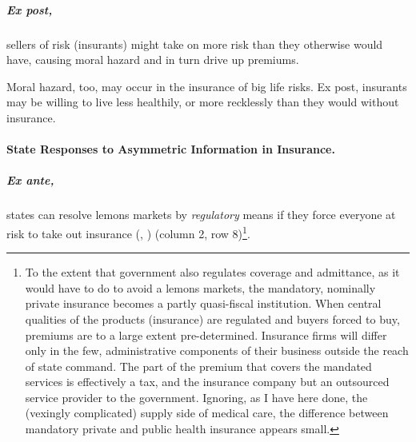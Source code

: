 \subparagraph[Moral Hazard]{Ex post,}  \label{sec:moral_hazard} sellers of risk (insurants) might take on more risk than they otherwise would have, causing moral hazard and in turn drive up premiums. 

Moral hazard, too, may occur in the insurance of big life risks. Ex post, insurants may be willing to live less healthily, or more recklessly than they would without insurance.

\paragraph{State Responses to Asymmetric Information in Insurance.}  \label{sec:state_insurance}

\subparagraph{Ex ante,} states can resolve lemons markets by \emph{regulatory} means if they force everyone at risk to take out insurance (\citealt{Akerlof-1970-aa}, \citealt{Barr})
(column 2, row 8)\footnote{
	To the extent that government also regulates coverage and admittance, as it would have to do to avoid a lemons markets, the mandatory, nominally private insurance becomes a partly quasi-fiscal institution. When central qualities of the products (insurance) are regulated and buyers forced to buy, premiums are to a large extent pre-determined. Insurance firms will differ only in the few, administrative components of their business outside the reach of state command. The part of the premium that covers the mandated services is effectively a tax, and the insurance company but an outsourced service provider to the government. Ignoring, as I have here done, the (vexingly complicated) supply side of medical care, the difference between mandatory private and public health insurance appears small.}.

